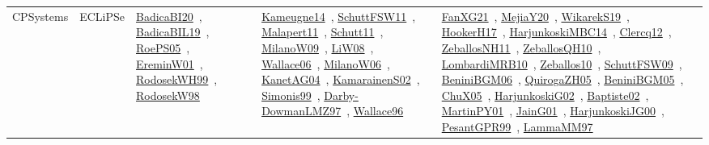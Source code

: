 {\begin{longtable}{lp{3cm}>{\raggedright\arraybackslash}p{6cm}>{\raggedright\arraybackslash}p{6cm}>{\raggedright\arraybackslash}p{8cm}}
CPSystems & ECLiPSe & \href{../works/BadicaBI20.pdf}{BadicaBI20}~\cite{BadicaBI20}, \href{../works/BadicaBIL19.pdf}{BadicaBIL19}~\cite{BadicaBIL19}, \href{../works/RoePS05.pdf}{RoePS05}~\cite{RoePS05}, \href{../works/EreminW01.pdf}{EreminW01}~\cite{EreminW01}, \href{../works/RodosekWH99.pdf}{RodosekWH99}~\cite{RodosekWH99}, \href{../works/RodosekW98.pdf}{RodosekW98}~\cite{RodosekW98} & \href{../works/Kameugne14.pdf}{Kameugne14}~\cite{Kameugne14}, \href{../works/SchuttFSW11.pdf}{SchuttFSW11}~\cite{SchuttFSW11}, \href{../works/Malapert11.pdf}{Malapert11}~\cite{Malapert11}, \href{../works/Schutt11.pdf}{Schutt11}~\cite{Schutt11}, \href{../works/MilanoW09.pdf}{MilanoW09}~\cite{MilanoW09}, \href{../works/LiW08.pdf}{LiW08}~\cite{LiW08}, \href{../works/Wallace06.pdf}{Wallace06}~\cite{Wallace06}, \href{../works/MilanoW06.pdf}{MilanoW06}~\cite{MilanoW06}, \href{../works/KanetAG04.pdf}{KanetAG04}~\cite{KanetAG04}, \href{../works/KamarainenS02.pdf}{KamarainenS02}~\cite{KamarainenS02}, \href{../works/Simonis99.pdf}{Simonis99}~\cite{Simonis99}, \href{../works/Darby-DowmanLMZ97.pdf}{Darby-DowmanLMZ97}~\cite{Darby-DowmanLMZ97}, \href{../works/Wallace96.pdf}{Wallace96}~\cite{Wallace96} & \href{../works/FanXG21.pdf}{FanXG21}~\cite{FanXG21}, \href{../works/MejiaY20.pdf}{MejiaY20}~\cite{MejiaY20}, \href{../works/WikarekS19.pdf}{WikarekS19}~\cite{WikarekS19}, \href{../works/HookerH17.pdf}{HookerH17}~\cite{HookerH17}, \href{../works/HarjunkoskiMBC14.pdf}{HarjunkoskiMBC14}~\cite{HarjunkoskiMBC14}, \href{../works/Clercq12.pdf}{Clercq12}~\cite{Clercq12}, \href{../works/ZeballosNH11.pdf}{ZeballosNH11}~\cite{ZeballosNH11}, \href{../works/ZeballosQH10.pdf}{ZeballosQH10}~\cite{ZeballosQH10}, \href{../works/LombardiMRB10.pdf}{LombardiMRB10}~\cite{LombardiMRB10}, \href{../works/Zeballos10.pdf}{Zeballos10}~\cite{Zeballos10}, \href{../works/SchuttFSW09.pdf}{SchuttFSW09}~\cite{SchuttFSW09}, \href{../works/BeniniBGM06.pdf}{BeniniBGM06}~\cite{BeniniBGM06}, \href{../works/QuirogaZH05.pdf}{QuirogaZH05}~\cite{QuirogaZH05}, \href{../works/BeniniBGM05.pdf}{BeniniBGM05}~\cite{BeniniBGM05}, \href{../works/ChuX05.pdf}{ChuX05}~\cite{ChuX05}, \href{../works/HarjunkoskiG02.pdf}{HarjunkoskiG02}~\cite{HarjunkoskiG02}, \href{../works/Baptiste02.pdf}{Baptiste02}~\cite{Baptiste02}, \href{../works/MartinPY01.pdf}{MartinPY01}~\cite{MartinPY01}, \href{../works/JainG01.pdf}{JainG01}~\cite{JainG01}, \href{../works/HarjunkoskiJG00.pdf}{HarjunkoskiJG00}~\cite{HarjunkoskiJG00}, \href{../works/PesantGPR99.pdf}{PesantGPR99}~\cite{PesantGPR99}, \href{../works/LammaMM97.pdf}{LammaMM97}~\cite{LammaMM97}\\

\end{longtable}}
